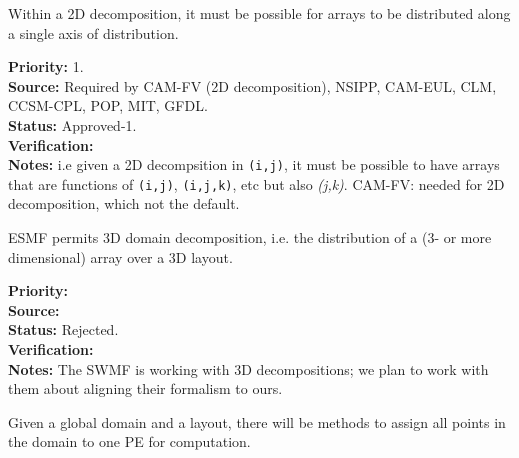 
Within a 2D decomposition, it must be possible for arrays to be
distributed along a single axis of distribution.

\begin{reqlist}
{\bf Priority:} 1. \\ 
{\bf Source:} Required by CAM-FV (2D decomposition), NSIPP, CAM-EUL, CLM, CCSM-CPL, POP, MIT, GFDL. \\
{\bf Status:} Approved-1. \\
{\bf Verification:} \\
{\bf Notes:} i.e given a 2D decompsition in \texttt{(i,j)}, it must be
  possible to have arrays that are functions of \texttt{(i,j)},
  \texttt{(i,j,k)}, etc but also \emph{(j,k)}.  CAM-FV: needed for
  2D decomposition, which not the default.
\end{reqlist}


ESMF permits 3D domain decomposition, i.e. the distribution of a
(3- or more dimensional) array over a 3D layout.

\begin{reqlist}
{\bf Priority:} \\
{\bf Source:} \\
{\bf Status:} Rejected. \\
{\bf Verification:} \\
{\bf Notes:} The SWMF is working with 3D decompositions; we plan to
work with them about aligning their formalism to ours.
\end{reqlist}


Given a global domain and a layout, there will be methods to assign
all points in the domain to one PE for computation. 

